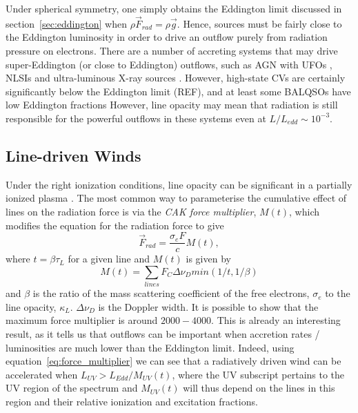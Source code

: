 Under spherical symmetry, one simply obtains the Eddington limit discussed
in section~\ref{sec:eddington} when $\rho \vec{F}_{rad} = \rho \vec{g}$. 
Hence, sources must be fairly close to the Eddington luminosity in order 
to drive an outflow purely from radiation 
pressure on electrons. There are a number of accreting systems that may drive
super-Eddington (or close to Eddington) outflows, 
such as AGN with UFOs \citep[e.g.][]{reeves2002,pounds2016},
NLSIs \citep{done2015} and ultra-luminous X-ray sources \citep[ULXs;][]{walton2013}.
However, high-state CVs are certainly significantly below the Eddington limit (REF),
and at least some BALQSOs have low Eddington fractions \citep{grupenousek2015}
However, line opacity may mean that radiation is still responsible for the 
powerful outflows in these systems even at $L / L_{edd} \sim 10^{-3}$.

\subsection{Line-driven Winds}

Under the right ionization conditions, line opacity can be significant in
a partially ionized plasma \citep[][hereafter CAK]{CAK75}. 
The most common way to parameterise the cumulative
effect of lines on the radiation force is via the {\em CAK force multiplier}, $M(t)$,
which modifies the equation for the radiation force to give \citep[][CAK, ]{castor1974}
\begin{equation}
\label{eq:force_multiplier}
\vec{F}_{rad} = \frac{\sigma_e F}{c} M(t),
\end{equation}
where $t = \beta \tau_L$ for a given line and $M(t)$ is given by 
\begin{equation}
\label{eq:force_multiplier2}
M(t) = \sum_{lines} F_C \Delta \nu_D min (1/t, 1/\beta) 
\end{equation}
and $\beta$ is the ratio of the mass scattering coefficient of the free
electrons, $\sigma_e$ to the line opacity, $\kappa_L$. $\Delta \nu_D$ is the Doppler
width. It is possible to show \citep[CAK, ][]{owocki1988} that the maximum force multiplier
is around $2000-4000$. This is already an interesting result, as it tells us
that outflows can be important when accretion rates / luminosities
are much lower than the Eddington limit. Indeed, using 
equation~\ref{eq:force_multiplier} we can see that a radiatively driven wind 
can be accelerated when $L_{UV} > L_{Edd} / M_{UV}(t)$, where the UV subscript 
pertains to the UV region of the spectrum and $M_{UV}(t)$ will thus depend on
the lines in this region and their relative ionization and excitation fractions.

